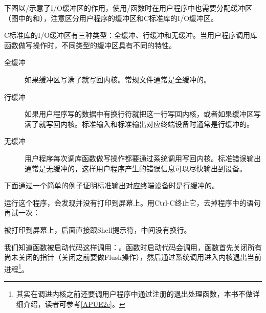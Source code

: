 下图以/示意了I/\BookSplit{}O缓冲区的作用，使用/函数时在用户程序中也需要分配缓冲区（图中的和），注意区分用户程序的缓冲区和C标准库的I/\BookSplit{}O缓冲区。




C标准库的I/\BookSplit{}O缓冲区有三种类型：全缓冲、行缓冲和无缓冲。当用户程序调用库函数做写操作时，不同类型的缓冲区具有不同的特性。


\begin{description}
\item[{全缓冲}]


如果缓冲区写满了就写回内核。常规文件通常是全缓冲的。

\item[{行缓冲}]


如果用户程序写的数据中有换行符就把这一行写回内核，或者如果缓冲区写满了就写回内核。标准输入和标准输出对应终端设备时通常是行缓冲的。

\item[{无缓冲}]


用户程序每次调库函数做写操作都要通过系统调用写回内核。标准错误输出通常是无缓冲的，这样用户程序产生的错误信息可以尽快输出到设备。


\end{description}


下面通过一个简单的例子证明标准输出对应终端设备时是行缓冲的。




运行这个程序，会发现并没有打印到屏幕上。用Ctrl-C终止它，去掉程序中的语句再试一次：




被打印到屏幕上，后面直接跟Shell提示符，中间没有换行。



我们知道函数被启动代码这样调用：。函数时启动代码会调用，函数首先关闭所有尚未关闭的指针（关闭之前要做Flush操作），然后通过系统调用进入内核退出当前进程\footnote[35]{其实在调进内核之前还要调用户程序中通过注册的退出处理函数，本书不做详细介绍，读者可参考\hyperlink{db.bi01.bibli.apue}{[APUE2e]}。}。



